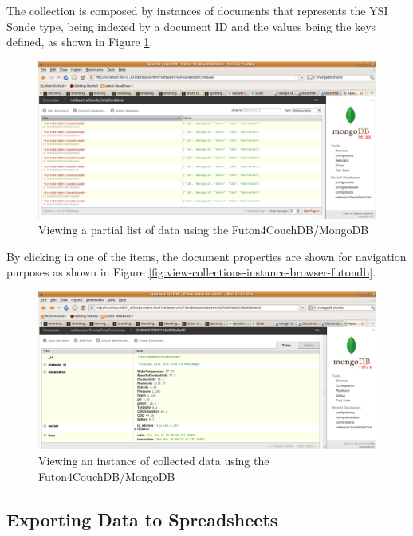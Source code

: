 The collection is composed by instances of documents that represents the YSI
Sonde type, being indexed by a document ID and the values being the keys
defined, as shown in Figure \ref{fig:view-collected-data-list-browser-futondb}.

\begin{figure}[!h]
  \centering
  \includegraphics[scale=0.65]{../diagrams/view-collected-data-list-browser-futondb}
  \caption{Viewing a partial list of data using the Futon4CouchDB/MongoDB}
  \label{fig:view-collected-data-list-browser-futondb}
\end{figure}

By clicking in one of the items, the document properties are shown for
navigation purposes as shown in Figure
\ref{fig:view-collections-instance-browser-futondb}.

\begin{figure}[!h]
  \centering
  \includegraphics[scale=0.6]{../diagrams/view-collected-data-instance-browser-futondb}
  \caption{Viewing an instance of collected data using the Futon4CouchDB/MongoDB}
  \label{fig:view-collected-data-instance-browser-futondb}
\end{figure}

\subsection{Exporting Data to Spreadsheets}

